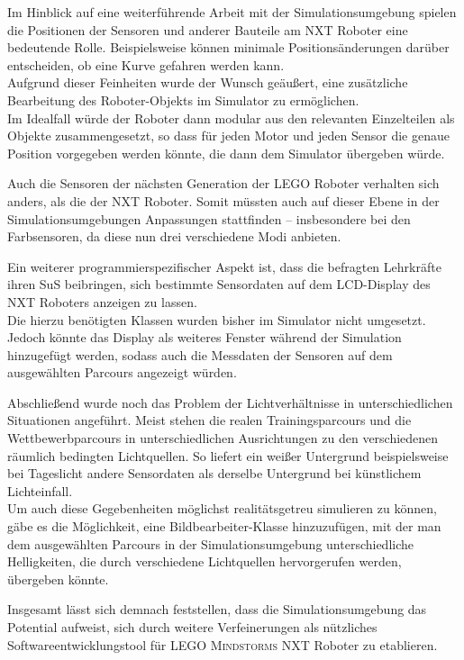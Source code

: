 \documentclass[paper=a4, DIV=calc, BCOR=12mm, twoside=on, onecolumn=on, open = right, titlepage =on, parskip =half-, headsepline = on, footsepline = off, chapterprefix = off, appendixprefix = on, fontsize = 12pt, numbers = noenddot, abstract = on]{scrbook}
\begin{document}
Im Hinblick auf eine weiterführende Arbeit mit der Simulationsumgebung spielen die Positionen der Sensoren und anderer Bauteile am NXT Roboter eine bedeutende Rolle. Beispielsweise können minimale Positionsänderungen darüber entscheiden, ob eine Kurve gefahren werden kann.\\
Aufgrund dieser Feinheiten wurde der Wunsch geäußert, eine zusätzliche Bearbeitung des Roboter-Objekts im Simulator zu ermöglichen.\\
Im Idealfall würde der Roboter dann modular aus den relevanten Einzelteilen als Objekte zusammengesetzt, so dass für jeden Motor und jeden Sensor die genaue Position vorgegeben werden könnte, die dann dem Simulator übergeben würde.

Auch die Sensoren der nächsten Generation der \textsc{LEGO} Roboter verhalten sich anders, als die der NXT Roboter. Somit müssten auch auf dieser Ebene in der Simulationsumgebungen Anpassungen stattfinden -- insbesondere bei den Farbsensoren, da diese nun drei verschiedene Modi anbieten.

Ein weiterer programmierspezifischer Aspekt ist, dass die befragten Lehrkräfte ihren SuS beibringen, sich bestimmte Sensordaten auf dem LCD-Display des NXT Roboters anzeigen zu lassen.\\
Die hierzu benötigten Klassen wurden bisher im Simulator nicht umgesetzt. Jedoch könnte das Display als weiteres Fenster während der Simulation hinzugefügt werden, sodass auch die Messdaten der Sensoren auf dem ausgewählten Parcours angezeigt würden. 

Abschließend wurde noch das Problem der Lichtverhältnisse in unterschiedlichen Situationen angeführt. Meist stehen die realen Trainingsparcours und die Wettbewerbparcours in unterschiedlichen Ausrichtungen zu den verschiedenen räumlich bedingten Lichtquellen. So liefert ein weißer Untergrund beispielsweise bei Tageslicht andere Sensordaten als derselbe Untergrund bei künstlichem Lichteinfall.\\
Um auch diese Gegebenheiten möglichst realitätsgetreu simulieren zu können, gäbe es die Möglichkeit, eine Bildbearbeiter-Klasse hinzuzufügen, mit der man dem ausgewählten Parcours in der Simulationsumgebung unterschiedliche Helligkeiten, die durch verschiedene Lichtquellen hervorgerufen werden, übergeben könnte.

Insgesamt lässt sich demnach feststellen, dass die Simulationsumgebung das Potential aufweist, sich durch weitere Verfeinerungen als nützliches Softwareentwicklungstool für \textsc{LEGO Mindstorms} NXT Roboter zu etablieren.
\end{document}

